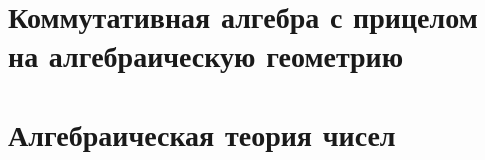 \documentclass[dvipsnames, 11pt]{article}
\begin{document}
    
    \tableofcontents


    \section{Коммутативная алгебра с прицелом на алгебраическую геометрию}


    
    
    
    
    


    \newpage

    \section{Алгебраическая теория чисел}

    
    
    
    
    
    
    
    
    
    
       
\end{document}
